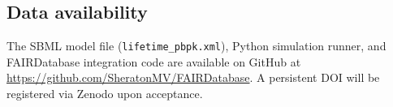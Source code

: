 \documentclass[preprint,12pt]{elsarticle}
\begin{document}
\begin{linenumbers}
\section*{Data availability}
The SBML model file (\texttt{lifetime\_pbpk.xml}), Python simulation
runner, and FAIRDatabase integration code are available on GitHub at
\url{https://github.com/SheratonMV/FAIRDatabase}. A persistent DOI will
be registered via Zenodo upon acceptance.

%   




\end{linenumbers}
\end{document}
